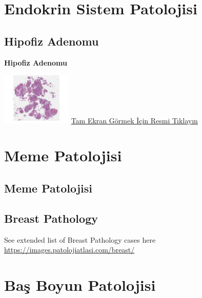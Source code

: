 \documentclass[
  letterpaper,
  DIV=11,
  numbers=noendperiod]{scrreprt}
\begin{document}
\part{Endokrin Sistem Patolojisi}

\hypertarget{sec-hipofiz-adenomu}{%
\chapter{Hipofiz Adenomu}\label{sec-hipofiz-adenomu}}

\textbf{Hipofiz Adenomu}

\href{https://images.patolojiatlasi.com/pituitary-adenoma/HE.html}{\includegraphics[width=0.25\textwidth,height=\textheight]{./screenshots/pituitary-adenoma_screenshot.png}}
\href{https://images.patolojiatlasi.com/pituitary-adenoma/HE.html}{Tam
Ekran Görmek İçin Resmi Tıklayın}

\part{Meme Patolojisi}

\hypertarget{meme-patolojisi-1}{%
\chapter*{Meme Patolojisi}\label{meme-patolojisi-1}}


\hypertarget{breast-pathology}{%
\chapter*{Breast Pathology}\label{breast-pathology}}


See extended list of Breast Pathology cases here
\url{https://images.patolojiatlasi.com/breast/}

\part{Baş Boyun Patolojisi}
\end{document}
